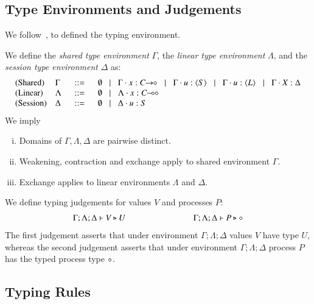 
\subsection{Type Environments and Judgements}
We follow~\cite{tlca07},
to defined the typing environment.
%
\begin{definition}\rm
	We define the {\em shared type environment} $\Gamma$,
	the {\em linear type environment} $\Lambda$, and
	the {\em session type environment} $\Delta$ as:
	\[
	\begin{array}{llcl}
		\text{(Shared)}		& \Gamma  & \bnfis &	\emptyset \bnfbar \Gamma \cat x: \shot{C} \bnfbar \Gamma \cat u: \chtype{S} \bnfbar
								\Gamma \cat u: \chtype{L} \bnfbar \Gamma \cat \varp{X}: \Delta
		\\
		\text{(Linear)}		& \Lambda & \bnfis &	\emptyset \bnfbar \Lambda \cat x: \lhot{C}
		\\
		\text{(Session)}	& \Delta  & \bnfis &	\emptyset \bnfbar \Delta \cat u:S
	\end{array}
	\]
	We imply
	\begin{enumerate}[i.]
		\item	Domains of $\Gamma, \Lambda, \Delta$ are pairwise distinct.
		\item	Weakening, contraction and exchange apply to shared environment $\Gamma$.
		\item	Exchange applies to linear environments $\Lambda$ and $\Delta$. 
	\end{enumerate}
\end{definition}
%
\noi We define typing judgements for values $V$
and processes $P$:
%
\[	\begin{array}{c}
		\Gamma; \Lambda; \Delta \vdash V \triangleright U \qquad \qquad \qquad \qquad \Gamma; \Lambda; \Delta \vdash P \triangleright \diamond
	\end{array}
\]
%
\noi The first judgement asserts that under environment $\Gamma; \Lambda; \Delta$
values $V$ have type $U$,
whereas the second judgement asserts that under environment $\Gamma; \Lambda; \Delta$
process $P$ has the typed process type $\diamond$.


\subsection{Typing Rules}

